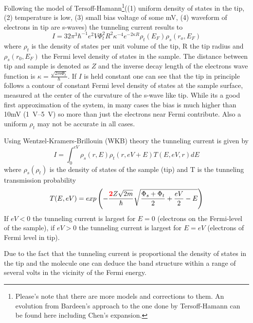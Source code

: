 Following the model of  
Tersoff-Hamann\footnote{Please's note that there are more models and 
corrections to them. An evolution from Bardeen's approach to the one done by 
Tersoff-Hamann can be found here \cite{lounis_theory_2014, 
wortmann_interpretation_2000} including Chen's expansion.}((1) uniform density of 
states in the tip, (2) temperature is low, (3) small bias voltage of some mV, 
(4) waveform of electrons in tip are s-waves) the tunneling current results to 
$$I=32\pi^3\hbar^{-1}e^2V\Phi_t^2 R^2\kappa^{-4}e^{-2\kappa R}\rho_t(E_F)\rho_s(r_o,E_F)$$ where $\rho_t$ is the density of states per unit volume of the tip, R the tip radius and $\rho_s(r_0,E_F)$ the Fermi level density of states in the sample\cite{bonnell_scanning_1993}. The distance between tip and sample is denoted as $Z$ and the inverse decay length of the electrons wave function is $\kappa=\frac{\sqrt{2m\Phi_t}}{\hbar}$. If $I$ is held constant one can see that the tip in principle follows a contour of constant Fermi level density of states at the sample surface, measured at the center of the curvature of the s-wave like tip. While its a good first approximation of the system, in many cases the bias is much higher than 10mV (\SIrange{1}{5}{\V}) so more than just the electrons near Fermi contribute. Also a uniform $\rho_t$ may not be accurate in all cases.

Using  Wentzel-Kramers-Brillouin (WKB) theory\cite{wentzel_verallgemeinerung_1926, kramers_wellenmechanik_1926, brillouin_mecanique_1926} the tunneling current is given by
\begin{equation}
I=\int_0^{eV}\rho_s(r,E)\rho_t(r,eV+E)T(E,eV,r)dE
\label{WKB}
\end{equation}
where $\rho_s(\rho_t)$ is the density of states of the sample (tip) and T is the tunneling transmission probability
\begin{equation}
T(E,eV)=exp\left(-\frac{\textcolor{red}{\textbf{2}}Z\sqrt{2m}}{\hbar}\sqrt{\frac{\Phi_s+\Phi_t}{2}+\frac{eV}{2}-E}\right)
\label{Transmission-function} 
\end{equation}
If $eV<0$ the tunneling current is largest for $E=0$ (electrons on the Fermi-level of the sample), if $eV>0$ the tunneling current is largest for $E=eV$ (electrons of Fermi level in tip).

Due to the fact that the tunneling current is proportional the density of states in the tip and the molecule one can deduce the band structure within a range of several volts in the vicinity of the Fermi energy.

